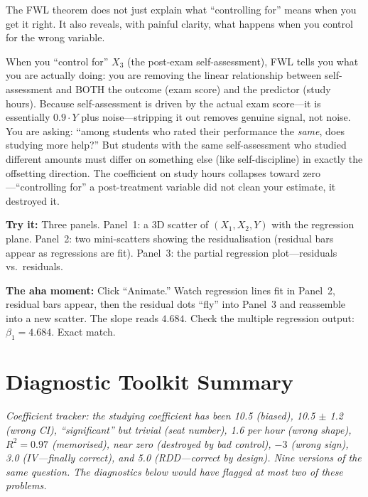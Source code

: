 \documentclass[11pt,a4paper]{article}
\theoremstyle{definition}
\theoremstyle{plain}
\theoremstyle{remark}
\begin{document}
The FWL theorem does not just explain what ``controlling for'' means when you get it right. It also reveals, with painful clarity, what happens when you control for the wrong variable.

\begin{keyinsight}
When you ``control for'' $X_3$ (the post-exam self-assessment), FWL tells you what you are actually doing: you are removing the linear relationship between self-assessment and BOTH the outcome (exam score) and the predictor (study hours). Because self-assessment is driven by the actual exam score---it is essentially $0.9 \cdot Y$ plus noise---stripping it out removes genuine signal, not noise. You are asking: ``among students who rated their performance the \emph{same}, does studying more help?'' But students with the same self-assessment who studied different amounts must differ on something else (like self-discipline) in exactly the offsetting direction. The coefficient on study hours collapses toward zero---``controlling for'' a post-treatment variable did not clean your estimate, it destroyed it.
\end{keyinsight}

\begin{vizspec}[title={``The Double Residual'' --- FWL Animator}]
\textbf{Try it:} Three panels. Panel~1: a 3D scatter of $(X_1, X_2, Y)$ with the regression plane. Panel~2: two mini-scatters showing the residualisation (residual bars appear as regressions are fit). Panel~3: the partial regression plot---residuals vs.\ residuals.

\textbf{The aha moment:} Click ``Animate.'' Watch regression lines fit in Panel~2, residual bars appear, then the residual dots ``fly'' into Panel~3 and reassemble into a new scatter. The slope reads $4.684$. Check the multiple regression output: $\beta_1 = 4.684$. Exact match.
\end{vizspec}

\section{Diagnostic Toolkit Summary}\label{sec:diagnostics}

\noindent\textit{Coefficient tracker: the studying coefficient has been 10.5 (biased), 10.5 $\pm$ 1.2 (wrong CI), ``significant'' but trivial (seat number), 1.6 per hour (wrong shape), $R^2 = 0.97$ (memorised), near zero (destroyed by bad control), $-3$ (wrong sign), 3.0 (IV---finally correct), and 5.0 (RDD---correct by design). Nine versions of the same question. The diagnostics below would have flagged at most two of these problems.}
\end{document}
